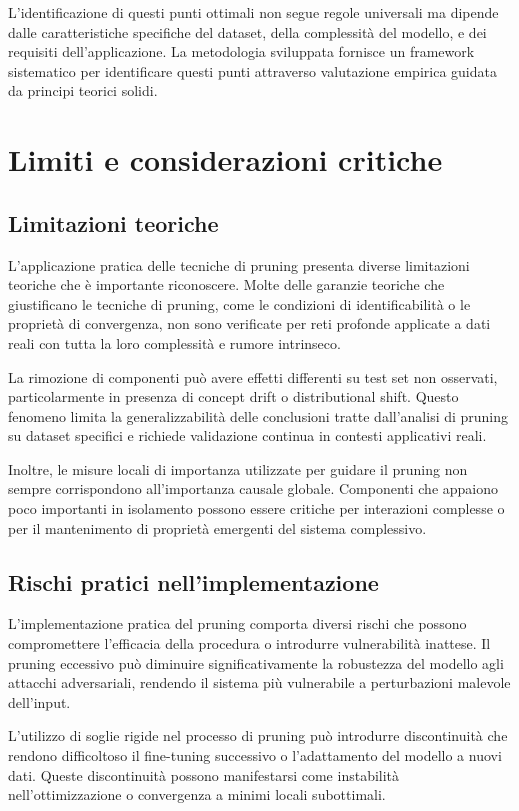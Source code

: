 \documentclass[a4paper,12pt]{report}
\begin{document}
	L'identificazione di questi punti ottimali non segue regole universali ma dipende dalle caratteristiche specifiche del dataset, della complessità del modello, e dei requisiti dell'applicazione. La metodologia sviluppata fornisce un framework sistematico per identificare questi punti attraverso valutazione empirica guidata da principi teorici solidi.
	
	\section{Limiti e considerazioni critiche}
	
	\subsection{Limitazioni teoriche}
	L'applicazione pratica delle tecniche di pruning presenta diverse limitazioni teoriche che è importante riconoscere. Molte delle garanzie teoriche che giustificano le tecniche di pruning, come le condizioni di identificabilità o le proprietà di convergenza, non sono verificate per reti profonde applicate a dati reali con tutta la loro complessità e rumore intrinseco.
	
	La rimozione di componenti può avere effetti differenti su test set non osservati, particolarmente in presenza di concept drift o distributional shift. Questo fenomeno limita la generalizzabilità delle conclusioni tratte dall'analisi di pruning su dataset specifici e richiede validazione continua in contesti applicativi reali.
	
	Inoltre, le misure locali di importanza utilizzate per guidare il pruning non sempre corrispondono all'importanza causale globale. Componenti che appaiono poco importanti in isolamento possono essere critiche per interazioni complesse o per il mantenimento di proprietà emergenti del sistema complessivo.
	
	\subsection{Rischi pratici nell'implementazione}
	L'implementazione pratica del pruning comporta diversi rischi che possono compromettere l'efficacia della procedura o introdurre vulnerabilità inattese. Il pruning eccessivo può diminuire significativamente la robustezza del modello agli attacchi adversariali, rendendo il sistema più vulnerabile a perturbazioni malevole dell'input.
	
	L'utilizzo di soglie rigide nel processo di pruning può introdurre discontinuità che rendono difficoltoso il fine-tuning successivo o l'adattamento del modello a nuovi dati. Queste discontinuità possono manifestarsi come instabilità nell'ottimizzazione o convergenza a minimi locali subottimali.
	
\end{document}
